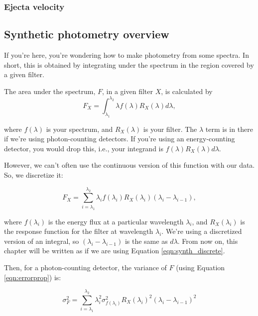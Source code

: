 \subsubsection{Ejecta velocity}
\label{sec:ejectavelocity}

\subsection{Synthetic photometry overview}

If you're here, you're wondering how to make photometry from some spectra. In short, this is obtained by integrating under the spectrum in the region covered by a given filter. 

The area under the spectrum, $F$, in a given filter $X$, is calculated by
\begin{equation}
    F_{X} = \int_{\lambda_{1}}^{\lambda_{2}} \lambda f(\lambda) R_{X}(\lambda) d\lambda,
\label{eqn:synthint}
\end{equation}


where $f(\lambda)$ is your spectrum, and $R_{X}(\lambda)$ is your filter. The $\lambda$ term is in there if we're using photon-counting detectors. If you're using an energy-counting detector, you would drop this, i.e., your integrand is $f(\lambda) R_{X}(\lambda) d\lambda$.

However, we can't often use the continuous version of this function with our data. So, we discretize it:

\begin{equation}
    F_{X} = \sum_{i=\lambda_{1}}^{\lambda_{2}} \lambda_{i} f(\lambda_{i}) R_{X}(\lambda_{i})(\lambda_{i} - \lambda_{i-1}),
\label{eqn:synth_discrete}
\end{equation}

where $f(\lambda_{i})$ is the energy flux at a particular wavelength $\lambda_{i}$, and $R_{X}(\lambda_{i})$ is the response function for the filter at wavelength $\lambda_{i}$. We're using a discretized version of an integral, so $(\lambda_{i} - \lambda_{i-1})$ is the same as $d\lambda$. From now on, this chapter will be written as if we are using Equation \ref{eqn:synth_discrete}.

Then, for a photon-counting detector, the variance of $F$ (using Equation \ref{eqn:errorprop}) is:

\begin{equation}
    \sigma_{F}^{2} = \sum_{i=\lambda_{1}}^{\lambda_{2}} \lambda_{i}^{2}\sigma_{f(\lambda_{i})}^{2} R_{X}(\lambda_{i})^{2}(\lambda_{i} - \lambda_{i-1})^{2}
\end{equation}

